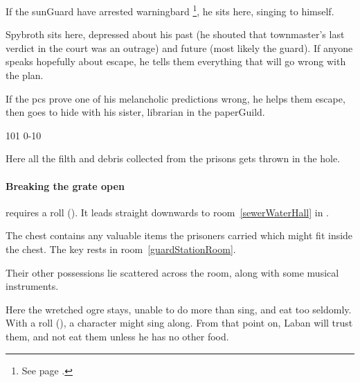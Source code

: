 \begin{multicols}{2}


If the \gls{sunGuard} have arrested \gls{warningbard}%
\footnote{See page \pageref{warningbard}.},
he sits here, singing to himself.


Spybroth sits here, depressed about his past (he shouted that \gls{townmaster}'s last verdict in the \gls{court} was an outrage) and future (most likely the \gls{guard}).
If anyone speaks hopefully about escape, he tells them everything that will go wrong with the plan.

If the \glspl{pc} prove one of his melancholic predictions wrong, he helps them escape, then goes to hide with his sister, \gls{librarian} in the \gls{paperGuild}.


%
  {{1}{0}{1}}%
  {{0}{-1}{0}}%
  {%
  }%
  {}%
  {\lootSmall}%
  {}%

\label{spyBroth}


Here all the filth and debris collected from the prisons gets thrown in the hole.

\paragraph{Breaking the grate open}
requires a  roll (\tn[10]).
It leads straight downwards to room~\vref{sewerWaterHall} in .


The chest contains any valuable items the prisoners carried which might fit inside the chest.
The key rests in room~\ref{guardStationRoom}.

Their other possessions lie scattered across the room, along with some musical instruments.


Here the wretched \gls{ogre} stays, unable to do more than sing, and eat too seldomly.
With a  roll (\tn[12]), a character might sing along.
From that point on, Laban will trust them, and not eat them unless he has no other food.


\end{multicols}
